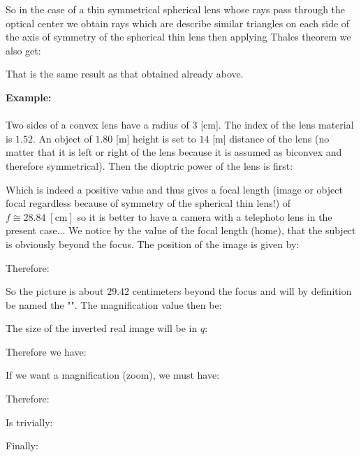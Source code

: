 	So in the case of a thin symmetrical spherical lens whose rays pass through the optical center we obtain rays which are describe similar triangles on each side of the axis of symmetry of the spherical thin lens then applying Thales theorem we also get:
	
	That is the same result as that obtained already above.
	\begin{tcolorbox}[colframe=black,colback=white,sharp corners]
	\textbf{{\Large {}}Example:}\\\\
	Two sides of a convex lens have a radius of $3$ [cm]. The index of the lens material is $1.52$. An object of $1.80$ [m] height is set to $14$ [m] distance of the lens (no matter that it is left or right of the lens because it is assumed as biconvex and therefore symmetrical). Then the dioptric power of the lens is first:
	
	Which is indeed a positive value and thus gives a focal length (image or object focal regardless because of symmetry of the spherical thin lens!) of	$f\cong 28.84\;[\text{cm}]$ so it is better to have a camera with a telephoto lens in the present case... We notice by the value of the focal length (home), that the subject is obviously beyond the focus. The position of the image is given by:
	
	Therefore:
	
	So the picture is about $29.42$ centimeters beyond the focus and will by definition be named the "". The magnification value then be:
	
	The size of the inverted real image will be in $q$:
	
	\end{tcolorbox}
	Therefore we have:
	
	If we want a magnification (zoom), we must have:
	
	Therefore:
		
	Is trivially:
	
	Finally:
	
